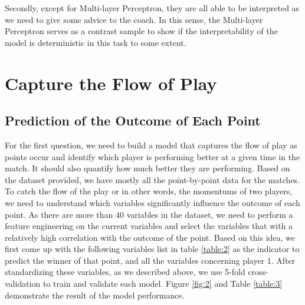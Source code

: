 \documentclass[12pt]{article}
\begin{document}
Secondly, except for Multi-layer Perceptron, they are all able to be interpreted as we need to give some advice 
to the coach. In this sense, the Multi-layer Perceptron serves as a contrast sample to show if the interpretability of the model is deterministic in this task to some extent.


\section{Capture the Flow of Play}
\subsection{Prediction of the Outcome of Each Point}
\quad For the first question, we need to build a model that captures the flow of play as points occur and identify which player is performing better at a given time in the match. It should also quantify how much better they are performing\cite{pdf-tennis}.
Based on the dataset provided, we have mostly all the point-by-point data for the matches. To catch the flow of the play or in other words, the momentums of two players, we need to understand which variables significantly influence the outcome of each point. As there are more than 40 variables in the dataset, we need to perform a feature engineering on the current variables and select the variables that with a relatively high correlation with the outcome of the point. Based on this idea, we first come up with the following variables list in table \ref{table:2} as the indicator to predict the winner of that point, and all the variables concerning player 1. 
After standardizing these variables, as we described above, we use 5-fold cross-validation to train and validate each model. Figure \ref{fig:2} and Table \ref{table:3} demonstrate the result of the model performance.
\end{document}
